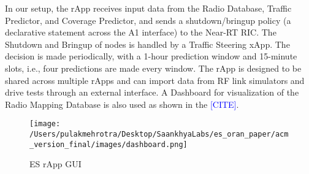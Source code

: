 In our setup, the rApp receives input data from the Radio Database, Traffic Predictor, and Coverage Predictor, and sends a shutdown/bringup policy (a declarative statement across the A1 interface) to the Near-RT RIC. 
The Shutdown and Bringup of nodes is handled by a Traffic Steering xApp. 
The decision is made periodically, with a 1-hour prediction window and 15-minute slots, i.e., four predictions are made every window. 
The rApp is designed to be shared across multiple rApps and can import data from RF link simulators and drive tests through an external interface. 
A Dashboard for visualization of the Radio Mapping Database is also used as shown in the \textcolor{blue}{[CITE]}. \\

%

\begin{figure}[ht]
    \centering
    \texttt{[image: /Users/pulakmehrotra/Desktop/SaankhyaLabs/es\_oran\_paper/acm\_version\_final/images/dashboard.png]}
    \caption{ES rApp GUI}
    \label{fig:dashboard}
    \end{figure}


